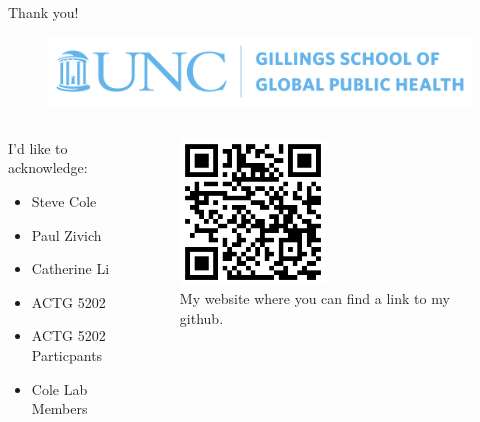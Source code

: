 \documentclass{beamer}
\begin{document}
    
 \begin{frame}
    {\Huge Thank you!}
    \begin{figure}[H] 
       \centering
        \includegraphics[width=\textwidth]{images/gillings_blue.jpg} 
       \caption*{} 
   \end{figure}  
       
       \begin{columns}
        \begin{column}{0.5\textwidth}
             I'd like to acknowledge:
             \begin{itemize}
                \item Steve Cole
                \item Paul Zivich
                \item Catherine Li
                \item ACTG 5202
                \item ACTG 5202 Particpants
                \item Cole Lab Members
             \end{itemize}
        \end{column}
        \begin{column}{0.5\textwidth}
           
           \begin{figure}[H] 
               \centering
               \includegraphics[width=0.5\textwidth]{images/qr_black.png} 
               \caption*{My website where you can find a link to my github.} 
           \end{figure} 
       \end{column} 
        
     \end{columns}
\end{frame}
\end{document}
